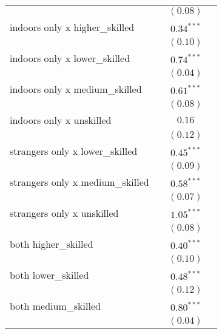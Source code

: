 \begin{table}
\begin{center}
\begin{tabular}{l c c c}
                                 &               & $(0.08)$      &               \\
indoors only x higher\_skilled   &               & $0.34^{***}$  &               \\
                                 &               & $(0.10)$      &               \\
indoors only x lower\_skilled    &               & $0.74^{***}$  &               \\
                                 &               & $(0.04)$      &               \\
indoors only x medium\_skilled   &               & $0.61^{***}$  &               \\
                                 &               & $(0.08)$      &               \\
indoors only x unskilled         &               & $0.16$        &               \\
                                 &               & $(0.12)$      &               \\
strangers only x lower\_skilled  &               & $0.45^{***}$  &               \\
                                 &               & $(0.09)$      &               \\
strangers only x medium\_skilled &               & $0.58^{***}$  &               \\
                                 &               & $(0.07)$      &               \\
strangers only x unskilled       &               & $1.05^{***}$  &               \\
                                 &               & $(0.08)$      &               \\
both higher\_skilled             &               & $0.40^{***}$  &               \\
                                 &               & $(0.10)$      &               \\
both lower\_skilled              &               & $0.48^{***}$  &               \\
                                 &               & $(0.12)$      &               \\
both medium\_skilled             &               & $0.80^{***}$  &               \\
                                 &               & $(0.04)$      &               \\

\end{tabular}
\end{center}
\end{table}
